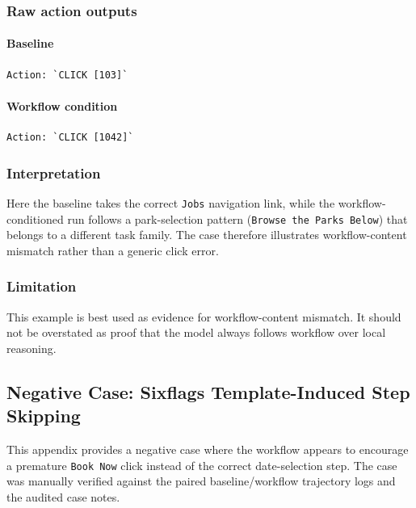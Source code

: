 \subsubsection{Raw action outputs}

\paragraph{Baseline}

\begin{verbatim}
Action: `CLICK [103]`
\end{verbatim}

\paragraph{Workflow condition}

\begin{verbatim}
Action: `CLICK [1042]`
\end{verbatim}

\subsubsection{Interpretation}

Here the baseline takes the correct \texttt{Jobs} navigation link, while
the workflow-conditioned run follows a park-selection pattern
(\texttt{Browse the Parks Below}) that belongs to a different task
family. The case therefore illustrates workflow-content mismatch rather
than a generic click error.

\subsubsection{Limitation}

This example is best used as evidence for workflow-content mismatch. It
should not be overstated as proof that the model always follows workflow
over local reasoning.


\clearpage
\subsection{Negative Case: Sixflags Template-Induced Step Skipping}\label{app:B5}

This appendix provides a negative case where the workflow appears to
encourage a premature \texttt{Book\ Now} click instead of the correct
date-selection step. The case was manually verified against the paired
baseline/workflow trajectory logs and the audited case notes.

